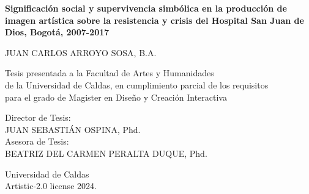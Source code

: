 \begin{titlepage}
\renewcommand*{\thepage}{Title}

    \begin{center} 
        \vspace*{3cm}
        
        {\fontsize{16pt}{22pt}\selectfont\textbf
            {Significación social y supervivencia simbólica en la producción de imagen artística sobre la resistencia y crisis del Hospital San Juan de Dios, Bogotá, 2007-2017}
        }

        \vspace{1.5cm}
        
        
        \vspace{0.5cm}
        
        	JUAN CARLOS ARROYO SOSA, B.A. \\

        \vspace{1.5cm}
        
        	Tesis presentada a la Facultad de Artes y Humanidades \\
            de la Universidad de Caldas, en cumplimiento parcial de los requisitos \\
            para el grado de Magister en Diseño y Creación Interactiva

        
        \vspace{1.5cm}
        
        \textcolor{edit30sept}{Director de Tesis:}\\        

        \textcolor{edit30sept}{JUAN SEBASTIÁN OSPINA, Phd.}\\

        Asesora de Tesis:\\        

        BEATRIZ DEL CARMEN PERALTA DUQUE, Phd.\\
        \vspace{1.5cm}
        
            Universidad de Caldas\\
            \vspace{0.5cm}
            Artistic-2.0 license 2024. 
    
    \end{center}

\end{titlepage}
